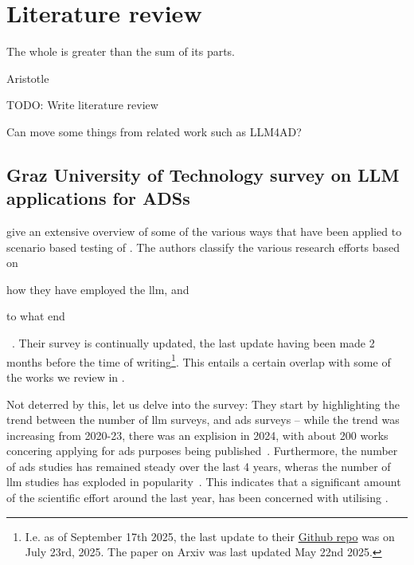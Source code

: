 \chapter{Literature review}\label{sec:literatureReview}

\epigraph{The whole is greater than the sum of its parts.}{Aristotle}

TODO: Write literature review

Can move some things from related work such as LLM4AD?

\section{Graz University of Technology survey on LLM applications for ADSs} %

\citeauthor{surveyLLMScenarioBasedTesting} give an extensive overview of some of the various ways
that  have been applied to scenario based testing of .
The authors classify the various research efforts based on \begin{inparaenum}
  \item how they have employed the \acrshort{llm}, and
  \item to what end
\end{inparaenum}~\cite{surveyLLMScenarioBasedTesting}.
Their survey is continually updated, the last update having been made 2 months before the time of
writing\footnote{I.e. as of September 17th 2025, the last update to their
  \href{https://github.com/ftgTUGraz/LLM4ADSTest}{Github repo} was on July 23rd, 2025. The paper on
  Arxiv was last updated May 22nd 2025.}. This entails a certain overlap with some of the works we
review in .

Not deterred by this, let us delve into the survey:
They start by highlighting the trend between the number of \acrshort{llm} surveys, and
\acrshort{ads} surveys -- while the trend was increasing from 2020-23, there was an explision in
\num{2024}, with about \num{200} works concering applying  for \acrlong{ads}
purposes being published~\cite[p. 1, figure (b)]{surveyLLMScenarioBasedTesting}. Furthermore, the
number of \acrshort{ads} studies has remained steady over the last \num{4}  years, wheras the number
of \acrshort{llm} studies has exploded in popularity~\cite[p. 1, figure
  (a)]{surveyLLMScenarioBasedTesting}. This indicates that a significant amount of the scientific
effort around  the last year, has been concerned with utilising .

